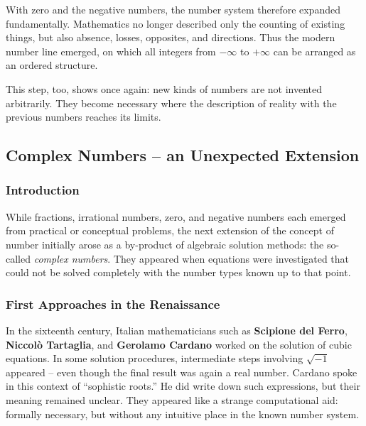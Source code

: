 With zero and the negative numbers,
the number system therefore expanded fundamentally.
Mathematics no longer described only the counting of existing things,
but also absence, losses, opposites, and directions.
Thus the modern number line emerged,
on which all integers from $-\infty$ to $+\infty$
can be arranged as an ordered structure.

This step, too, shows once again:
new kinds of numbers are not invented arbitrarily.
They become necessary
where the description of reality with the previous numbers reaches its limits.

\newpage
\noindent

\subsection{Complex Numbers -- an Unexpected Extension}
\label{sec:2.4_complex}

\subsubsection*{Introduction}
While fractions, irrational numbers, zero, and negative numbers each emerged
from practical or conceptual problems,
the next extension of the concept of number initially arose
as a by-product of algebraic solution methods:
the so-called \emph{complex numbers}.
They appeared when equations were investigated
that could not be solved completely with the number types known up to that point.

\subsubsection*{First Approaches in the Renaissance}
In the sixteenth century, Italian mathematicians such as
\textbf{Scipione del Ferro},
\textbf{Niccolò Tartaglia}, and
\textbf{Gerolamo Cardano}
worked on the solution of cubic equations.
In some solution procedures, intermediate steps involving $\sqrt{-1}$ appeared --
even though the final result was again a real number.
Cardano spoke in this context of ``sophistic roots.''
He did write down such expressions,
but their meaning remained unclear.
They appeared like a strange computational aid:
formally necessary, but without any intuitive place
in the known number system.

